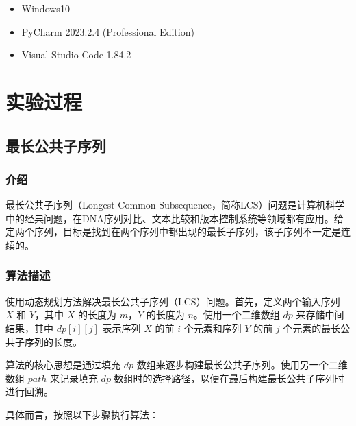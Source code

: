 \documentclass[lang=cn,11pt,a4paper]{elegantpaper}
\begin{document}
\begin{itemize}
    \item Windows10
    \item PyCharm 2023.2.4 (Professional Edition)
    \item Visual Studio Code 1.84.2
\end{itemize}

\section{实验过程}

\subsection{最长公共子序列}

\subsubsection{介绍}
最长公共子序列（Longest Common Subsequence，简称LCS）问题是计算机科学中的经典问题，在DNA序列对比、文本比较和版本控制系统等领域都有应用。给定两个序列，目标是找到在两个序列中都出现的最长子序列，该子序列不一定是连续的。


\subsubsection{算法描述}

使用动态规划方法解决最长公共子序列（LCS）问题。首先，定义两个输入序列 $X$ 和 $Y$，其中 $X$ 的长度为 $m$，$Y$ 的长度为 $n$。使用一个二维数组 $dp$ 来存储中间结果，其中 $dp[i][j]$ 表示序列 $X$ 的前 $i$ 个元素和序列 $Y$ 的前 $j$ 个元素的最长公共子序列的长度。

算法的核心思想是通过填充 $dp$ 数组来逐步构建最长公共子序列。使用另一个二维数组 $path$ 来记录填充 $dp$ 数组时的选择路径，以便在最后构建最长公共子序列时进行回溯。

具体而言，按照以下步骤执行算法：
\end{document}
